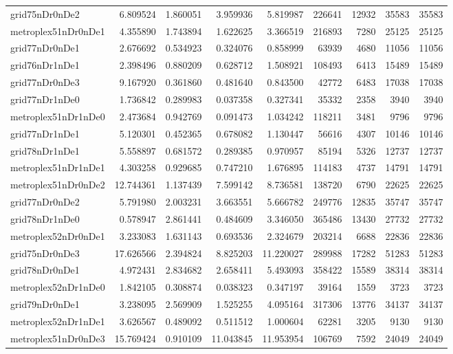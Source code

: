 \begin{longtable}{|l|r|r|r|r|r|r|r|r|}
grid75nDr0nDe2 & 6.809524 & 1.860051 & 3.959936 & 5.819987 & 226641 & 12932 & 35583 & 35583 \\
metroplex51nDr0nDe1 & 4.355890 & 1.743894 & 1.622625 & 3.366519 & 216893 & 7280 & 25125 & 25125 \\
grid77nDr0nDe1 & 2.676692 & 0.534923 & 0.324076 & 0.858999 & 63939 & 4680 & 11056 & 11056 \\
grid76nDr1nDe1 & 2.398496 & 0.880209 & 0.628712 & 1.508921 & 108493 & 6413 & 15489 & 15489 \\
grid77nDr0nDe3 & 9.167920 & 0.361860 & 0.481640 & 0.843500 & 42772 & 6483 & 17038 & 17038 \\
grid77nDr1nDe0 & 1.736842 & 0.289983 & 0.037358 & 0.327341 & 35332 & 2358 & 3940 & 3940 \\
metroplex51nDr1nDe0 & 2.473684 & 0.942769 & 0.091473 & 1.034242 & 118211 & 3481 & 9796 & 9796 \\
grid77nDr1nDe1 & 5.120301 & 0.452365 & 0.678082 & 1.130447 & 56616 & 4307 & 10146 & 10146 \\
grid78nDr1nDe1 & 5.558897 & 0.681572 & 0.289385 & 0.970957 & 85194 & 5326 & 12737 & 12737 \\
metroplex51nDr1nDe1 & 4.303258 & 0.929685 & 0.747210 & 1.676895 & 114183 & 4737 & 14791 & 14791 \\
metroplex51nDr0nDe2 & 12.744361 & 1.137439 & 7.599142 & 8.736581 & 138720 & 6790 & 22625 & 22625 \\
grid77nDr0nDe2 & 5.791980 & 2.003231 & 3.663551 & 5.666782 & 249776 & 12835 & 35747 & 35747 \\
grid78nDr1nDe0 & 0.578947 & 2.861441 & 0.484609 & 3.346050 & 365486 & 13430 & 27732 & 27732 \\
metroplex52nDr0nDe1 & 3.233083 & 1.631143 & 0.693536 & 2.324679 & 203214 & 6688 & 22836 & 22836 \\
grid75nDr0nDe3 & 17.626566 & 2.394824 & 8.825203 & 11.220027 & 289988 & 17282 & 51283 & 51283 \\
grid78nDr0nDe1 & 4.972431 & 2.834682 & 2.658411 & 5.493093 & 358422 & 15589 & 38314 & 38314 \\
metroplex52nDr1nDe0 & 1.842105 & 0.308874 & 0.038323 & 0.347197 & 39164 & 1559 & 3723 & 3723 \\
grid79nDr0nDe1 & 3.238095 & 2.569909 & 1.525255 & 4.095164 & 317306 & 13776 & 34137 & 34137 \\
metroplex52nDr1nDe1 & 3.626567 & 0.489092 & 0.511512 & 1.000604 & 62281 & 3205 & 9130 & 9130 \\
metroplex51nDr0nDe3 & 15.769424 & 0.910109 & 11.043845 & 11.953954 & 106769 & 7592 & 24049 & 24049 \\

\end{longtable}
